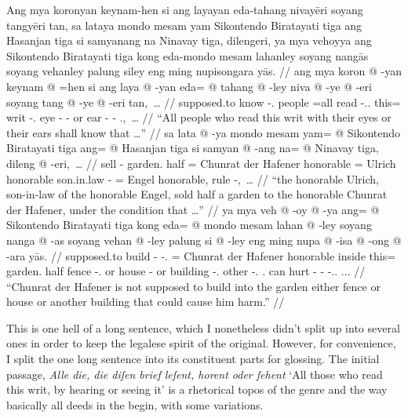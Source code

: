 \documentclass[12pt,paper=a4]{scrartcl}
\newcommand{\fw}[1]{\textit{#1}} %
\begin{document}
\pex
	\glpreamble Ang mya koronyan keynam-hen si ang layayan eda-tahang 
		nivayēri soyang tangyēri tan, sa lataya mondo mesam yam 
		Sikontendo Biratayati tiga ang Hasanjan tiga si samyanang na 
		Nina\-vay tiga, dilengeri, ya mya vehoyya ang Sikontendo 
		Biratayati tiga kong eda-mondo mesam lahanley soyang nangās 
		soyang vehanley palung siley eng ming nupisongara yās. //
	\a \begingl
		\gla ang mya koron @ -yan keynam @ =hen si ang laya @ -yan eda= 
		@ tahang @ -ley niva @ -ye @ -eri soyang tang @ -ye @ -eri 
			tan,~… //
		\glb \AgtT{} supposed.to know -\Tpl{}.\M{} people =all \Rel{} 
			\AgtT{} read -\Tpl{}.\M{}.\Top{} this= writ 
			-\Parg{}.\Inan{} eye -\Pl{} -\Ins{} or ear -\Pl{} 
			-\Ins{} \Tpl{}.\Gen{},~… //
		\glft \enquote{All people who read this writ with their eyes or 
			their ears shall know that …} //
	\endgl
	\a \begingl
		\gla sa lata @ -ya mondo mesam yam= @ Sikontendo Biratayati tiga 
			ang= @ Hasanjan tiga si samyan @ -ang na= @ Ninavay 
			tiga, dileng @ -eri,~… //
		\glb \PatT{} sell -\Tsg{} garden.\Top{} half \Dat{}= Chunrat 
			{der Hafener} honorable \Aarg{}= Ulrich honorable \Rel{} 
			son.in.law -\Aarg{} \Gen{}= Engel honorable, rule 
			-\Ins{},~… //
		\glft \enquote{the honorable Ulrich, son-in-law of the honorable 
			Engel, sold half a garden to the honorable Chunrat der 
			Hafener, under the condition that …} //
	\endgl
	\a \begingl
		\gla ya mya veh @ -oy @ -ya ang= @ Sikontendo Biratayati tiga 
			kong eda= @ mondo mesam lahan @ -ley soyang nanga @ -as 
			soyang vehan @ -ley palung si @ -ley eng ming nupa @ 
			-isa @ -ong @ -ara yās. //
		\glb \LocT{} supposed.to build -\Neg{} -\Tsg{}.\M{} \Aarg{}= 
			Chunrat {der Hafener} honorable inside this= 
			garden.\Top{} half fence -\Parg{}.\Inan{} or house 
			-\Parg{} or building -\Parg{}.\Inan{} other \Rel{} 
			-\Parg{}.\Inan{} \AgtT{}.\Inan{} can hurt -\Caus{} 
			-\Irr{} -\Tsg{}.\Inan{}.\Top{} \Tsg{}.\M{}.\Parg{}. //
		\glft \enquote{Chunrat der Hafener is not supposed to build into 
		the garden either fence or house or another building that could 
		cause him harm.} //
	\endgl
\xe

This is one hell of a long sentence, which I nonetheless didn't split up into 
several ones in order to keep the legalese spirit of the original. However, 
for convenience, I split the one long sentence into its constituent parts 
for glossing. The initial passage, \fw{Alle die, die diſen brief leſent, horent 
oder ſehent} `All those who read this writ, by hearing or seeing it' is a 
rhetorical topos of the genre and the way basically all deeds in the 
 begin, with some variations.
\end{document}
